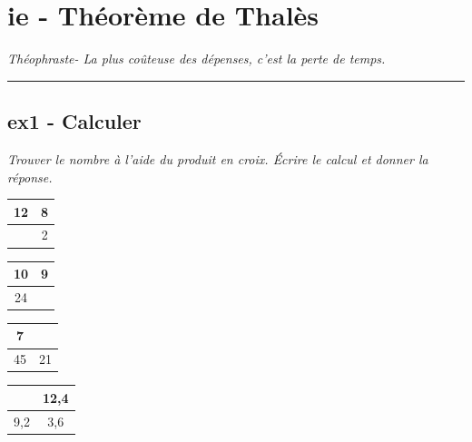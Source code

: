 \documentclass[12pt]{article}
\newcommand{\horrule}[1]{\rule{\linewidth}{#1}} %
\begin{document}

\newtheorem{Definition}{Définition}
\newtheorem{Theorem}{Théorème}
\newtheorem{Proposition}{Propriété}

\renewcommand{\labelitemi}{$\bullet$}
\renewcommand{\labelitemii}{$\circ$}

\setlength{\columnseprule}{1pt}

\section*{ie - Théorème de Thalès}
\begin{center}
  \textit{Théophraste- La plus coûteuse des dépenses, c’est la perte de temps.}
\end{center}
\horrule{2px}

\subsection*{ex1 - Calculer}
\textit{Trouver le nombre à l'aide du produit en croix. Écrire le calcul et donner la réponse.}

\begin{multicols}{4}

\begin{center}
  \begin{tabular}{|c|c|}
    \hline
    12 & 8  \\
    \hline 
       & 2  \\
    \hline
  \end{tabular}

  \begin{tabular}{|c|c|}
    \hline
    10 & 9  \\
    \hline 
    24 &   \\
    \hline
  \end{tabular}

    \begin{tabular}{|c|c|}
    \hline
    7 &   \\
    \hline 
    45  & 21  \\
    \hline
  \end{tabular}

    \begin{tabular}{|c|c|}
    \hline
      & 12,4  \\
    \hline 
     9,2  & 3,6  \\
    \hline
  \end{tabular}
\end{center}
\end{multicols}
\end{document}
